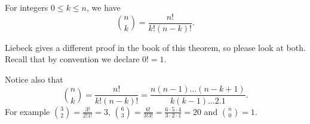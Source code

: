 \documentclass[11pt,dvipsnames]{book}
\numberwithin{figure}{section} %
\numberwithin{table}{section} %
\begin{document}
\begin{theorem}\label{t:choose}
For integers $0\leq k\leq n$, we have
\begin{equation}
\label{e:choose}
{n \choose k}=\frac{n!}{k!(n-k)!}
.\end{equation}
\end{theorem}

Liebeck gives a different proof in the book of this theorem, so please look at both. Recall that by convention we declare $0! = 1$.

Notice also that
\begin{equation}
{n \choose k}=\frac{n!}{k!(n-k)!} = \frac{n(n-1) \dots(n-k +1)}{k(k-1) \dots 2. 1}.
\end{equation}
For example ${3 \choose 2} = \frac{3!}{2!1!} = 3$,
${6 \choose 3} = \frac{6!}{3!3!} = \frac{6 \cdot 5 \cdot 4}{3 \cdot 2 \cdot 1} =20$ and ${n \choose 0} =1$.
\end{document}
